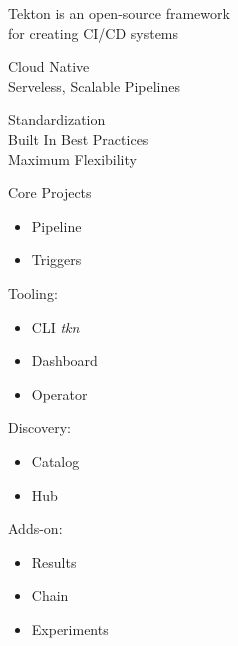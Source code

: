 \documentclass[aspectratio=169,11pt,hyperref={colorlinks=true}]{beamer}
\begin{document}
\begin{stripedframe}%
  {%
  Tekton is an open-source framework \\for creating CI/CD systems
  }%
  {%
  Cloud Native \\
  \vspace{0.03\textheight}
  Serveless, Scalable Pipelines \\
  \vspace{0.1\textheight}
  \centering
  
  }%
  {%
  Standardization \\
  \vspace{0.03\textheight}
  Built In Best Practices \\
  \vspace{0.03\textheight}
  Maximum Flexibility \\
  }%
  {%
  Core Projects
  \begin{itemize}
    \item Pipeline
    \item Triggers
  \end{itemize}
  \vspace{0.01\textheight}
  Tooling:
  \begin{itemize}
    \item CLI \textit{tkn}
    \item Dashboard
    \item Operator
  \end{itemize}
  }%
  {%
  Discovery:
  \begin{itemize}
    \item Catalog
    \item Hub
  \end{itemize}
  \vspace{0.01\textheight}
  Adds-on:
  \begin{itemize}
    \item Results
    \item Chain
    \item Experiments
  \end{itemize}
  }%
\end{stripedframe}
\end{document}

